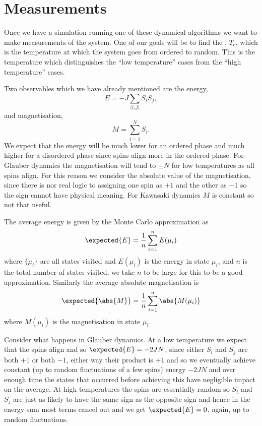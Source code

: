 \documentclass[fleqn]{NotesClass}
\begin{document}
    
    \section{Measurements}
    Once we have a simulation running one of these dynamical algorithms we want to make measurements of the system.
    One of our goals will be to find the , \(T_{\mathrm{c}}\), which is the temperature at which the system goes from ordered to random.
    This is the temperature which distinguishes the \enquote{low temperature} cases from the \enquote{high temperature} cases.
    
    Two observables which we have already mentioned are the energy,
    \begin{equation}
        E = -J\sum_{\langle i, j \rangle} S_iS_j,
    \end{equation}
    and magnetisation,
    \begin{equation}
        M = \sum_{i=1}^{N} S_i.
    \end{equation}
    We expect that the energy will be much lower for an ordered phase and much higher for a disordered phase since spins align more in the ordered phase.
    For Glauber dynamics the magnetisation will tend to \(\pm N\) for low temperatures as all spins align.
    For this reason we consider the absolute value of the magnetisation, since there is nor real logic to assigning one spin as \(+1\) and the other as \(-1\) so the sign cannot have physical meaning.
    For Kawasaki dynamics \(M\) is constant so not that useful.
    
    The average energy is given by the Monte Carlo approximation as
    \begin{equation}
        \expected{E} = \frac{1}{n} \sum_{i=1}^{n} E(\mu_i)
    \end{equation}
    where \(\{\mu_i\}\) are all states visited and \(E(\mu_i)\) is the energy in state \(\mu_i\), and \(n\) is the total number of states visited, we take \(n\) to be large for this to be a good approximation.
    Similarly the average absolute magnetisation is
    \begin{equation}
        \expected{\abs{M}} = \frac{1}{n} \sum_{i=1}^{n} \abs{M(\mu_i)}
    \end{equation}
    where \(M(\mu_i)\) is the magnetisation in state \(\mu_i\).
    
    Consider what happens in Glauber dynamics.
    At a low temperature we expect that the spins align and so \(\expected{E} = -2JN\), since either \(S_i\) and \(S_j\) are both \(+1\) or both \(-1\), either way their product is \(+1\) and so we eventually achieve constant (up to random fluctuations of a few spins) energy \(-2JN\) and over enough time the states that occurred before achieving this have negligible impact on the average.
    At high temperatures the spins are essentially random so \(S_i\) and \(S_j\) are just as likely to have the same sign as the opposite sign and hence in the energy sum most terms cancel out and we get \(\expected{E} = 0\), again, up to random fluctuations.
    
\end{document}
